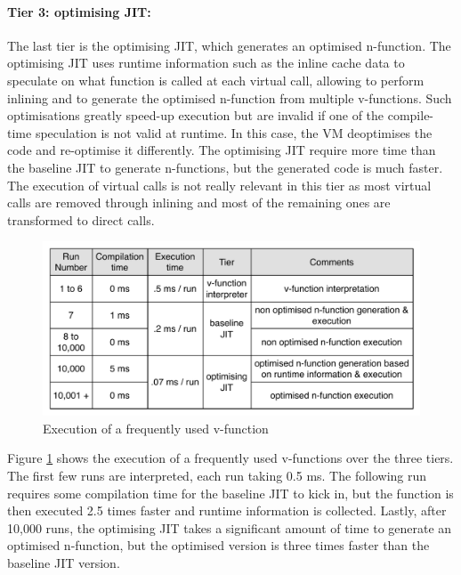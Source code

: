 \documentclass[a4paper,12pt,twoside]{../includes/ThesisStyle}
\begin{document}
\paragraph{Tier 3: optimising JIT: } The last tier is the optimising JIT, which generates an optimised n-function. The optimising JIT uses runtime information such as the inline cache data to speculate on what function is called at each virtual call, allowing to perform inlining and to generate the optimised n-function from multiple v-functions. Such optimisations greatly speed-up execution but are invalid if one of the compile-time speculation is not valid at runtime. In this case, the VM deoptimises the code and re-optimise it differently. The optimising JIT require more time than the baseline JIT to generate n-functions, but the generated code is much faster. The execution of virtual calls is not really relevant in this tier as most virtual calls are removed through inlining and most of the remaining ones are transformed to direct calls.

\begin{figure}[h!]
    \begin{center}
        \includegraphics[width=0.95\linewidth]{TieredArchitecture}
        \caption{Execution of a frequently used v-function}
        \label{fig:TieredArchitecture}
    \end{center}
\end{figure}

Figure \ref{fig:TieredArchitecture} shows the execution of a frequently used v-functions over the three tiers. The first few runs are interpreted, each run taking 0.5 ms. The following run requires some compilation time for the baseline JIT to kick in, but the function is then executed 2.5 times faster and runtime information is collected. Lastly, after 10,000 runs, the optimising JIT takes a significant amount of time to generate an optimised n-function, but the optimised version is three times faster than the baseline JIT version.
\end{document}
